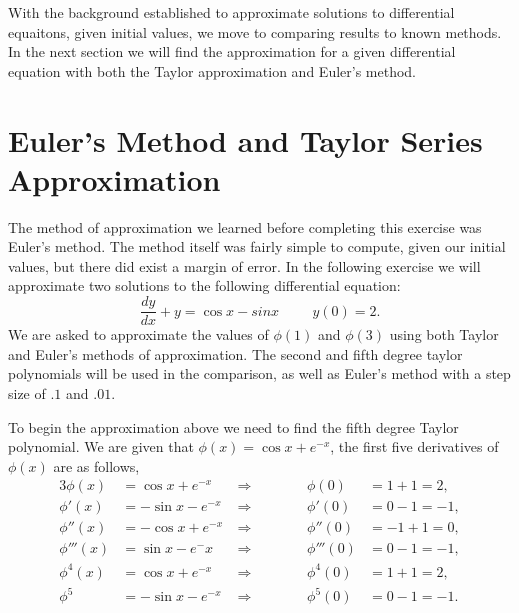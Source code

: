 \documentclass[12pt, letterpaper]{article}  %
\begin{document}
With the background established to approximate solutions to differential equaitons, given initial values,
we move to comparing results to known methods.  In the next section
we will find the approximation for a given differential equation with both the Taylor approximation and 
Euler's method.
\section{Euler's Method and Taylor Series Approximation}
The method of approximation we learned before completing this exercise was Euler's method.  The method itself was fairly 
simple to compute, given our initial values, but there did exist a margin of error.  In the following exercise we will approximate
two solutions to the following differential equation:
$$
\dfrac{dy}{dx} + y = \cos{x} - sin{x} \hspace{1cm} y(0) = 2.
$$
We are asked to approximate the values of $\phi(1)$ and $\phi(3)$ using both Taylor and Euler's methods of approximation.
The second and fifth degree taylor polynomials will be used in the comparison, as well as Euler's method with a step size
of $.1$ and $.01$.


To begin the approximation above we need to find the fifth degree Taylor polynomial.  We are given that
$\phi(x) = \cos{x} + e^{-x}$, the first five derivatives of $\phi(x)$ are as follows,
\begin{alignat*}{3}
  \phi(x) &= \cos{x} + e^{-x} &\ \Rightarrow\hspace{1cm}&  &\phi(0) &= 1 + 1 = 2, \\
  \phi'(x) &= -\sin{x} - e^{-x} &\ \Rightarrow\hspace{1cm}&  &\phi'(0) &= 0 - 1 = -1, \\
  \phi''(x) &= -\cos{x} + e^{-x} &\ \Rightarrow\hspace{1cm}&  &\phi''(0) &= -1 + 1 = 0, \\
  \phi'''(x) &= \sin{x} - e^-x &\ \Rightarrow\hspace{1cm}&  &\phi'''(0) &= 0 - 1 = -1, \\
  \phi^{4}(x) &= \cos{x} + e^{-x} &\ \Rightarrow\hspace{1cm}&  &\phi^{4}(0) &= 1 + 1 = 2, \\
  \phi^{5} &= -\sin{x} -e^{-x} &\ \Rightarrow\hspace{1cm}&  &\phi^{5}(0) &= 0 - 1 = -1. \\
\end{alignat*}
\end{document}
